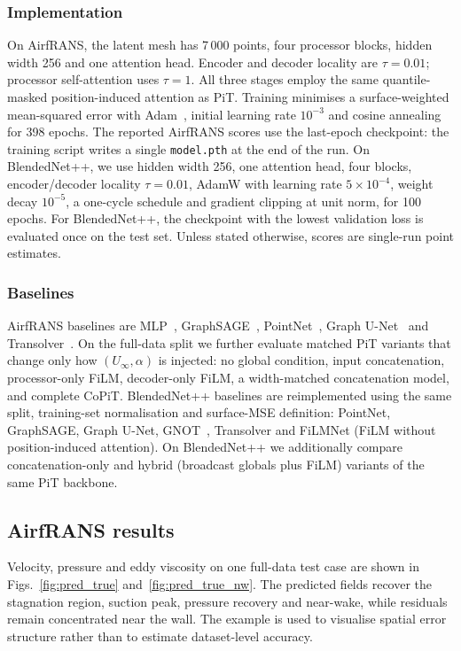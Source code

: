 \documentclass[final,3p,times]{elsarticle}
\begin{document}
\subsubsection{Implementation}
On AirfRANS, the latent mesh has 7\,000 points, four processor blocks, hidden width 256 and one attention head. Encoder and decoder locality are $\tau=0.01$; processor self-attention uses $\tau=1$. All three stages employ the same quantile-masked position-induced attention as PiT. Training minimises a surface-weighted mean-squared error with Adam~\cite{kingma2015adam}, initial learning rate $10^{-3}$ and cosine annealing~\cite{loshchilov2017cosine} for 398 epochs. The reported AirfRANS scores use the last-epoch checkpoint: the training script writes a single \texttt{model.pth} at the end of the run. On BlendedNet++, we use hidden width 256, one attention head, four blocks, encoder/decoder locality $\tau=0.01$, AdamW with learning rate $5\times 10^{-4}$, weight decay $10^{-5}$, a one-cycle schedule and gradient clipping at unit norm, for 100 epochs. For BlendedNet++, the checkpoint with the lowest validation loss is evaluated once on the test set. Unless stated otherwise, scores are single-run point estimates.

\subsubsection{Baselines}
AirfRANS baselines are MLP~\cite{goodfellow2016deep}, GraphSAGE~\cite{hamilton2017inductive}, PointNet~\cite{qi2017pointnet}, Graph U-Net~\cite{yue2018graph} and Transolver~\cite{wu2024transolver}. On the full-data split we further evaluate matched PiT variants that change only how $(U_{\infty},\alpha)$ is injected: no global condition, input concatenation, processor-only FiLM, decoder-only FiLM, a width-matched concatenation model, and complete CoPiT. BlendedNet++ baselines are reimplemented using the same split, training-set normalisation and surface-MSE definition: PointNet, GraphSAGE, Graph U-Net, GNOT~\cite{hao2023gnot}, Transolver and FiLMNet (FiLM without position-induced attention). On BlendedNet++ we additionally compare concatenation-only and hybrid (broadcast globals plus FiLM) variants of the same PiT backbone.

\subsection{AirfRANS results}
\label{sec:airfrans}

Velocity, pressure and eddy viscosity on one full-data test case are shown in Figs.~\ref{fig:pred_true} and~\ref{fig:pred_true_nw}. The predicted fields recover the stagnation region, suction peak, pressure recovery and near-wake, while residuals remain concentrated near the wall. The example is used to visualise spatial error structure rather than to estimate dataset-level accuracy.
\end{document}

